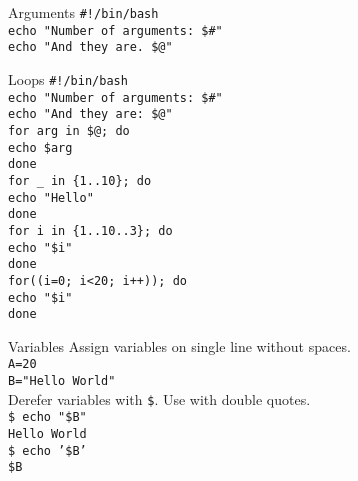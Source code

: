 \documentclass{beamer}
\let\tt\texttt
\begin{document}
\begin{frame}{Arguments}
        \tt{\#!/bin/bash}                       \\
        \tt{echo "Number of arguments: \$\#"}   \\
        \tt{echo "And they are. \$@"}           \\
\end{frame}

\begin{frame}{Loops}
        \tt{\#!/bin/bash}                       \\
        \tt{echo "Number of arguments: \$\#"}   \\
        \tt{echo "And they are: \$@"}           \\
        \tt{for arg in \$@; do}                 \\
        \quad \tt{echo \$arg}                   \\
        \tt{done}                               \\
        \tt{for \_ in \{1..10\}; do}            \\
        \quad \tt{echo "Hello"}                 \\
        \tt{done}                               \\
        \tt{for i in \{1..10..3\}; do}          \\
        \quad \tt{echo "\$i"}                   \\
        \tt{done}                               \\
        \tt{for((i=0; i<20; i++)); do}          \\
        \quad \tt{echo "\$i"}                   \\
        \tt{done}                               \\
\end{frame}

\begin{frame}{Variables}
        Assign variables on single line without spaces. \\
        \tt{A=20}                                       \\
        \tt{B="Hello World"}                            \\
        Derefer variables with \tt{\$}. Use with double quotes.  \\
        \tt{\$ echo "\$B"}                              \\
        \tt{Hello World}                                \\
        \tt{\$ echo '\$B'}                              \\
        \tt{\$B}
\end{frame}
\end{document}
